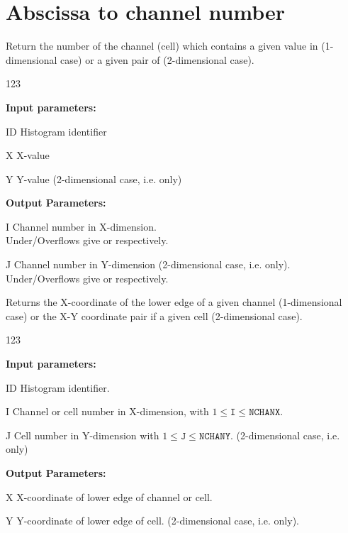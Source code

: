 \section{Abscissa to channel number}
\label{HABSCNUM}

\par
 
 
\Action
Return the number of the channel (cell)
which contains a given value in  (1-dimensional case) or
a given pair of  (2-dimensional case).
 
\begin{DLtt}{123}
\item[{\rm\bf Input parameters:}]
\item[ID] Histogram identifier
\item[X] X-value
\item[Y] Y-value (2-dimensional case, i.e.  only)
\item[{\rm\bf Output Parameters:}]
\item[I] Channel number in X-dimension.\\
Under/Overflows give  or  respectively.
\item[J] Channel number in Y-dimension
(2-dimensional case, i.e.  only).\\
Under/Overflows give  or  respectively.
\end{DLtt}
 
 
\Action
Returns the X-coordinate of the lower edge of a given channel
(1-dimensional case) or the X-Y coordinate pair if a given cell
(2-dimensional case).
 
\begin{DLtt}{123}
\item[{\rm\bf Input parameters:}]
\item[ID] Histogram identifier.
\item[I] Channel or cell number in X-dimension, with
\(1\leq\mathtt{I}\leq\mathtt{NCHANX}\).
\item[J] Cell number in Y-dimension with 
         \(1\leq\mathtt{J}\leq\mathtt{NCHANY}\).
(2-dimensional case, i.e.  only)
\item[{\rm\bf Output Parameters:}]
\item[X] X-coordinate of lower edge of channel or cell.
\item[Y] Y-coordinate of lower edge of cell.
(2-dimensional case, i.e.  only).
\end{DLtt}
 
